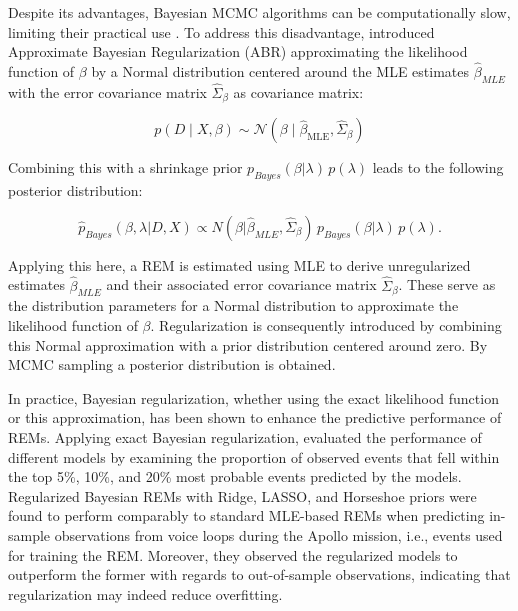 \documentclass{article}
\begin{document}
\begin{spacing}{2}
\begin{justify}
Despite its advantages, Bayesian MCMC algorithms can be computationally slow, limiting their practical use \citep{Karimova2024}. To address this disadvantage, \citet{Karimova2024} introduced Approximate Bayesian Regularization (ABR) approximating the likelihood function of $\beta$ by a Normal distribution centered around the MLE estimates $\hat{\beta}_{MLE}$ with the error covariance matrix $\hat{\Sigma}_{\beta}$ as covariance matrix:

\begin{equation}
    p(D \mid X, \beta) \sim \mathcal{N}(\beta \mid \hat{\beta}_{\text{MLE}}, \hat{\Sigma}_{\beta})
    \label{eq:approximation_likelihood}
\end{equation}

Combining this with a shrinkage prior $p_{Bayes}(\beta | \lambda) \, p(\lambda)$ leads to the following posterior distribution:

\begin{equation}
    \hat{p}_{Bayes}(\beta, \lambda | D, X) \propto N(\beta | \hat{\beta}_{MLE}, \hat{\Sigma}_{\beta}) \, p_{Bayes}(\beta | \lambda) \, p(\lambda) \text{.}
    \label{eq:bayesian_inference}
\end{equation}

Applying this here, a REM is estimated using MLE to derive unregularized estimates $\hat{\beta}_{MLE}$ and their associated error covariance matrix $\hat{\Sigma}_{\beta}$. These serve as the distribution parameters for a Normal distribution to approximate the likelihood function of $\beta$. Regularization is consequently introduced by combining this Normal approximation with a prior distribution centered around zero. By MCMC sampling a posterior distribution is obtained.

In practice, Bayesian regularization, whether using the exact likelihood function or this approximation, has been shown to enhance the predictive performance of REMs. Applying exact Bayesian regularization, \citet{Karimova2023} evaluated the performance of different models by examining the proportion of observed events that fell within the top 5\%, 10\%, and 20\% most probable events predicted by the models. Regularized Bayesian REMs with Ridge, LASSO, and Horseshoe priors were found to perform comparably to standard MLE-based REMs when predicting in-sample observations from voice loops during the Apollo mission, i.e., events used for training the REM. Moreover, they observed the regularized models to outperform the former with regards to out-of-sample observations, indicating that regularization may indeed reduce overfitting.


\end{justify}
\end{spacing}
\end{document}
